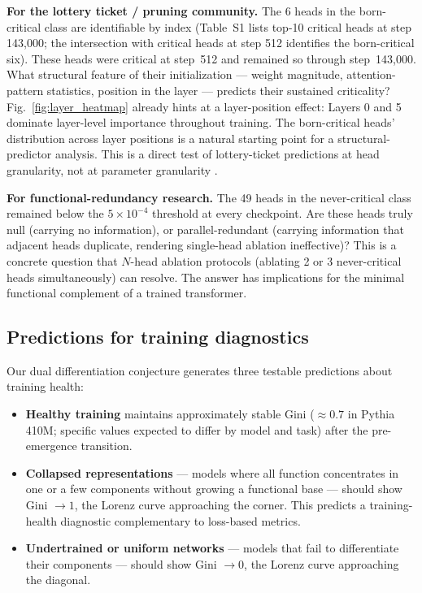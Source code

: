 \documentclass{article}
\begin{document}
\textbf{For the lottery ticket / pruning community.} The 6 heads in the born-critical class are identifiable by index (Table~S1 lists top-10 critical heads at step 143,000; the intersection with critical heads at step 512 identifies the born-critical six). These heads were critical at step~512 and remained so through step~143,000. What structural feature of their initialization --- weight magnitude, attention-pattern statistics, position in the layer --- predicts their sustained criticality? Fig.~\ref{fig:layer_heatmap} already hints at a layer-position effect: Layers 0 and 5 dominate layer-level importance throughout training. The born-critical heads' distribution across layer positions is a natural starting point for a structural-predictor analysis. This is a direct test of lottery-ticket predictions at head granularity, not at parameter granularity \citep{frankle2019lottery}.

\textbf{For functional-redundancy research.} The 49 heads in the never-critical class remained below the $5 \times 10^{-4}$ threshold at every checkpoint. Are these heads truly null (carrying no information), or parallel-redundant (carrying information that adjacent heads duplicate, rendering single-head ablation ineffective)? This is a concrete question that $N$-head ablation protocols (ablating 2 or 3 never-critical heads simultaneously) can resolve. The answer has implications for the minimal functional complement of a trained transformer.

\subsection{Predictions for training diagnostics}

Our dual differentiation conjecture generates three testable predictions about training health:

\begin{itemize}
    \item \textbf{Healthy training} maintains approximately stable Gini ($\approx 0.7$ in Pythia 410M; specific values expected to differ by model and task) after the pre-emergence transition.
    \item \textbf{Collapsed representations} --- models where all function concentrates in one or a few components without growing a functional base --- should show Gini $\to 1$, the Lorenz curve approaching the corner. This predicts a training-health diagnostic complementary to loss-based metrics.
    \item \textbf{Undertrained or uniform networks} --- models that fail to differentiate their components --- should show Gini $\to 0$, the Lorenz curve approaching the diagonal.
\end{itemize}
\end{document}
